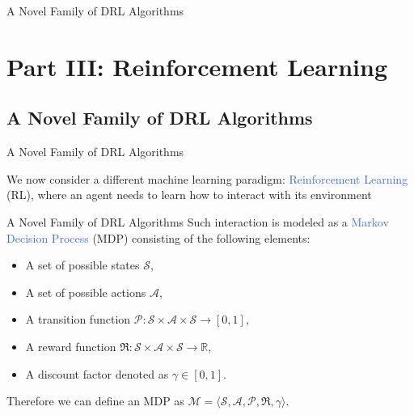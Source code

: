 \documentclass{beamer}
\begin{document}


\begin{frame}{A Novel Family of DRL Algorithms}
	\section{Part III: Reinforcement Learning}
	\subsection{A Novel Family of DRL Algorithms}
\end{frame}

\begin{frame}{A Novel Family of DRL Algorithms}

	\bigskip
	We now consider a different machine learning paradigm: \textcolor{RoyalBlue}{Reinforcement Learning} (RL), where an agent needs to learn how to interact with its environment

	\begin{figure}[htb!]
		\centering
		
 		\label{fig:rl_loop}
	\end{figure}

\end{frame}

\begin{frame}{A Novel Family of DRL Algorithms}
	Such interaction is modeled as a \textcolor{RoyalBlue}{Markov Decision Process} (MDP) consisting of the following elements:

\begin{itemize}
	\item A set of possible states $\mathcal{S}$,
	\item A set of possible actions $\mathcal{A}$,
	\item A transition function $\mathcal{P}:\mathcal{S}\times\mathcal{A}\times\mathcal{S}\rightarrow [0,1]$,
	\item A reward function $\Re:\mathcal{S}\times\mathcal{A}\times\mathcal{S}\rightarrow \mathbb{R}$,
	\item A discount factor denoted as $\gamma \in [0,1]$.
\end{itemize}

\bigskip

Therefore we can define an MDP as $\mathcal{M}=\langle\mathcal{S}, \mathcal{A}, \mathcal{P}, \Re, \gamma\rangle$.

\end{frame}
\end{document}

